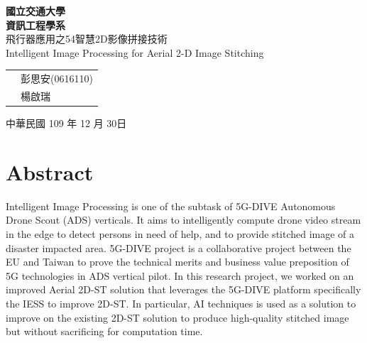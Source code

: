 \documentclass[12pt, a4paper]{article}
\begin{document}
\newcommand{\largeTitle}[1]{\fontsize{40}{50} #1}

\begin{titlepage}
		\begin{center}
			\vskip 1.0cm
			\largeTitle \textbf{國立交通大學} \\[0.25cm]
			\largeTitle \textbf{資訊工程學系} \\[0.25cm]

			\LARGE{飛行器應用之54智慧2D影像拼接技術} \\[0.5cm]

			\LARGE{Intelligent Image Processing for Aerial 2-D Image Stitching}
		\end{center}

		\vspace{\fill}
		\begin{tabular}{c l}
				{\makebox[8em][s]{\LARGE 大學生:}} & \LARGE 彭思安(0616110) \\[0.5cm]
			{\makebox[8em][s]{\LARGE 指導教授:}} & \LARGE 楊啟瑞 \\[0.5cm]
		\end{tabular}

		\vspace{3cm}
		\begin{center}
			{\LARGE 中華民國 109 年 12 月 30日}
		\end{center}
\end{titlepage}

\section{Abstract}
\label{sec:Abstract}
Intelligent Image Processing is one of the subtask of 5G-DIVE Autonomous Drone Scout (ADS) verticals. It 
aims  to  intelligently  compute  drone  video  stream  in  the  edge  to  detect  persons  in  need  of  help,  and  to 
provide stitched image of a disaster impacted area. 5G-DIVE project is a collaborative project between the 
EU  and  Taiwan  to  prove  the  technical  merits  and  business  value  preposition  of  5G  technologies  in  ADS 
vertical pilot. In this research project, we worked on an improved Aerial 2D-ST solution that leverages the 
5G-DIVE platform specifically the IESS to improve 2D-ST. In particular, AI techniques is used as a solution to 
improve on the existing 2D-ST solution to produce high-quality stitched image but without sacrificing for 
computation time.
\end{document}
